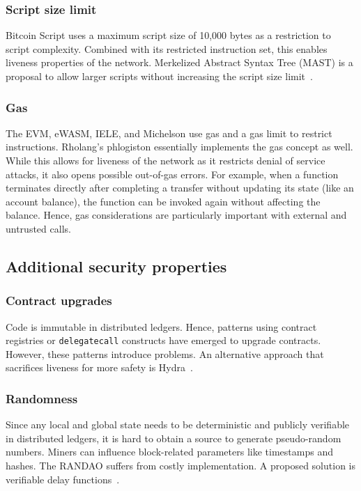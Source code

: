 \subsubsection{Script size limit}
Bitcoin Script uses a maximum script size of 10,000 bytes as a restriction to script complexity. Combined with its restricted instruction set, this enables liveness properties of the network. Merkelized Abstract Syntax Tree (MAST) is a proposal to allow larger scripts without increasing the script size limit~\cite{Harding2017}.

\subsubsection{Gas}
The EVM, eWASM, IELE, and Michelson use gas and a gas limit to restrict instructions. Rholang's phlogiston essentially implements the gas concept as well. While this allows for liveness of the network as it restricts denial of service attacks, it also opens possible out-of-gas errors. For example, when a function terminates directly after completing a transfer without updating its state (like an account balance), the function can be invoked again without affecting the balance.
Hence, gas considerations are particularly important with external and untrusted calls.


\subsection{Additional security properties} 
\subsubsection{Contract upgrades}
Code is immutable in distributed ledgers. Hence, patterns using contract registries or \texttt{delegatecall} constructs have emerged to upgrade contracts. However, these patterns introduce problems. An alternative approach that sacrifices liveness for more safety is Hydra~\cite{Breidenbach2018}.

\subsubsection{Randomness}
Since any local and global state needs to be deterministic and publicly verifiable in distributed ledgers, it is hard to obtain a source to generate pseudo-random numbers.
Miners can influence block-related parameters like timestamps and hashes. The RANDAO suffers from costly implementation. A proposed solution is verifiable delay functions~\cite{Boneh2018}.

